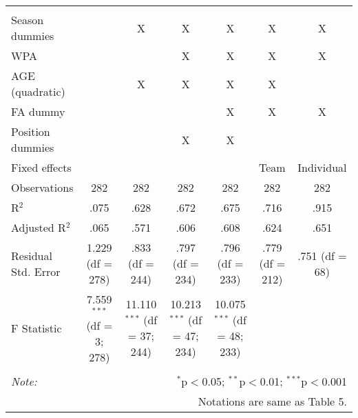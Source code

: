 \begin{table}[H]
\begin{tabular}{@{\extracolsep{5pt}}lcccccc}
  & & & & & & \\
\hline \\[-1.8ex]
Season dummies &  & X & X & X & X & X \\
WPA & & & X & X & X & X \\
AGE (quadratic) &  & X & X & X & X &  \\
FA dummy &  &  &  & X & X & X \\
Position dummies &  &  & X & X &  &  \\
Fixed effects &  &  &  &  & Team & Individual \\
Observations & 282 & 282 & 282 & 282 & 282 & 282 \\
R$^{2}$ & .075 & .628 & .672 & .675 & .716 & .915 \\
Adjusted R$^{2}$ & .065 & .571 & .606 & .608 & .624 & .651 \\
Residual Std. Error & 1.229 (df = 278) & .833 (df = 244) & .797 (df = 234) & .796 (df = 233) & .779 (df = 212) & .751 (df = 68) \\
F Statistic & 7.559$^{***}$ (df = 3; 278) & 11.110$^{***}$ (df = 37; 244) & 10.213$^{***}$ (df = 47; 234) & 10.075$^{***}$ (df = 48; 233) &  &  \\
\hline
\hline \\[-1.8ex]
\textit{Note:}  & \multicolumn{6}{r}{$^{*}$p$<$0.05; $^{**}$p$<$0.01; $^{***}$p$<$0.001} \\
& \multicolumn{6}{r}{Notations are same as Table 5.} \\
\end{tabular}
\end{table}
